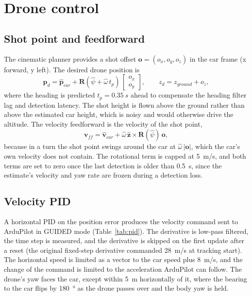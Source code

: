 \documentclass[11pt,a4paper]{report}
\begin{document}
\section{Drone control}
\label{sec:control}

\subsection{Shot point and feedforward}
The cinematic planner provides a shot offset $\mathbf{o}=(o_x,o_y,o_z)$ in the car
frame (x forward, y left). The desired drone position is
\begin{equation}
  \mathbf{p}_d = \hat{\mathbf{p}}_{car} + \mathbf{R}(\hat\psi + \hat\omega\,t_p)\,
  \begin{bmatrix}o_x\\ o_y\end{bmatrix},\qquad
  z_d = z_{ground} + o_z ,
\end{equation}
where the heading is predicted $t_p=\SI{0.35}{s}$ ahead to compensate the heading
filter lag and detection latency. The shot height is flown above the ground
rather than above the estimated car height, which is noisy and would otherwise
drive the altitude. The velocity feedforward is the velocity of the shot point,
\begin{equation}
  \mathbf{v}_{ff} = \hat{\mathbf{v}}_{car} + \hat\omega\,\hat{\mathbf{z}}\times
  \mathbf{R}(\hat\psi)\,\mathbf{o},
\end{equation}
because in a turn the shot point swings around the car at $\hat\omega\,|\mathbf{o}|$,
which the car's own velocity does not contain. The rotational term is capped at
\SI{5}{m/s}, and both terms are set to zero once the last detection is older than
\SI{0.5}{s}, since the estimate's velocity and yaw rate are frozen during a
detection loss.

\subsection{Velocity PID}
A horizontal PID on the position error produces the velocity command sent to
ArduPilot in GUIDED mode (Table~\ref{tab:pid}). The derivative is low-pass
filtered, the time step is measured, and the derivative is skipped on the first
update after a reset (the original fixed-step derivative commanded
\SI{28}{m/s} at tracking start). The horizontal speed is limited as a vector to
the car speed plus \SI{8}{m/s}, and the change of the command is limited to the
acceleration ArduPilot can follow. The drone's yaw faces the car, except within
\SI{5}{m} horizontally of it, where the bearing to the car flips by
\SI{180}{\degree} as the drone passes over and the body yaw is held.
\end{document}
